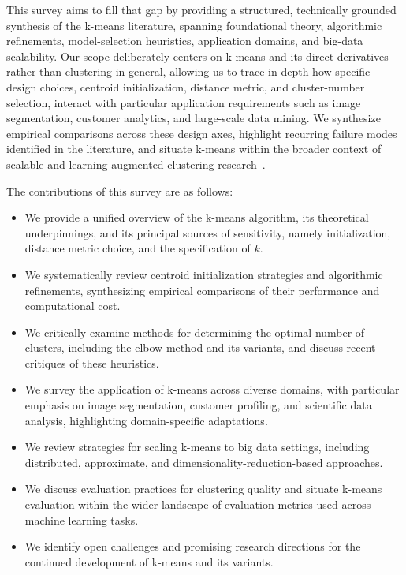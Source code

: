 This survey aims to fill that gap by providing a structured, technically grounded synthesis of the k-means literature, spanning foundational theory, algorithmic refinements, model-selection heuristics, application domains, and big-data scalability. Our scope deliberately centers on k-means and its direct derivatives rather than clustering in general, allowing us to trace in depth how specific design choices, centroid initialization, distance metric, and cluster-number selection, interact with particular application requirements such as image segmentation, customer analytics, and large-scale data mining. We synthesize empirical comparisons across these design axes, highlight recurring failure modes identified in the literature, and situate k-means within the broader context of scalable and learning-augmented clustering research~\cite{ergun2021learning,vardakas2022global}.

The contributions of this survey are as follows:
\begin{itemize}
\item We provide a unified overview of the k-means algorithm, its theoretical underpinnings, and its principal sources of sensitivity, namely initialization, distance metric choice, and the specification of $k$.
\item We systematically review centroid initialization strategies and algorithmic refinements, synthesizing empirical comparisons of their performance and computational cost.
\item We critically examine methods for determining the optimal number of clusters, including the elbow method and its variants, and discuss recent critiques of these heuristics.
\item We survey the application of k-means across diverse domains, with particular emphasis on image segmentation, customer profiling, and scientific data analysis, highlighting domain-specific adaptations.
\item We review strategies for scaling k-means to big data settings, including distributed, approximate, and dimensionality-reduction-based approaches.
\item We discuss evaluation practices for clustering quality and situate k-means evaluation within the wider landscape of evaluation metrics used across machine learning tasks.
\item We identify open challenges and promising research directions for the continued development of k-means and its variants.
\end{itemize}

